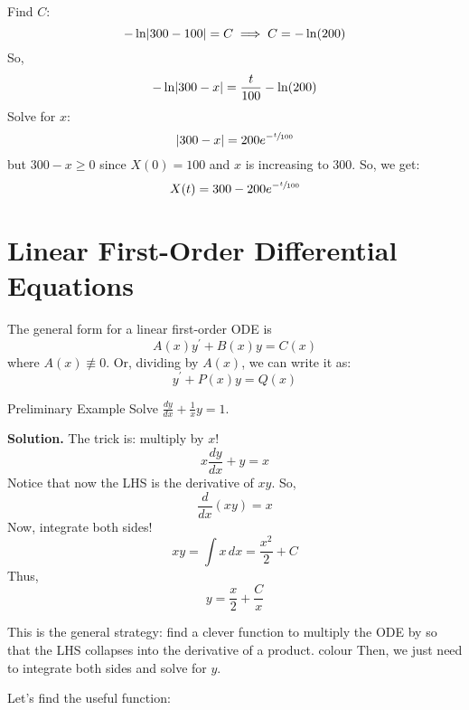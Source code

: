 Find $ C $: \[ -\ln\lvert300-100\rvert=C\implies C=-\ln(200) \]
So,
\[ -\ln\lvert300-x\rvert=\frac{t}{100}-\ln(200) \]
Solve for $ x $:
\[ \lvert300-x\rvert=200e^{-\sfrac{t}{100}} \]
but $ 300-x\geqslant 0 $ since $ X(0)=100 $ and $ x $ is increasing
to 300. So, we get:
\[ X(t)=300-200e^{-\sfrac{t}{100}} \]

\section{Linear First-Order Differential Equations}
The general form for a linear first-order ODE is
\[ A(x)y^\prime+B(x)y=C(x) \]
where $ A(x)\not\equiv 0 $. Or, dividing by $ A(x) $, we can write it as:
\[ y^\prime+P(x)y=Q(x) \]
\begin{Example}{Preliminary Example}{}
    Solve
    $ \frac{dy}{dx} +\frac{1}{x} y=1 $.

    \textbf{Solution.}
    The trick is: multiply by $ x $!
    \[ x \frac{dy}{dx} +y=x \]
    Notice that now the LHS is the derivative of $ xy $. So,
    \[ \frac{d}{dx} (xy)=x \]
    Now, integrate both sides!
    \[ xy=\int x\, d{x}=\frac{x^2}{2} +C \]
    Thus,
    \[ y=\frac{x}{2} +\frac{C}{x} \]
\end{Example}
This is the general strategy: find a clever function to multiply
the ODE by so that the LHS collapses into the derivative of a product.
colour
Then, we just need to integrate both sides and solve for $ y $.

Let's find the useful function:

